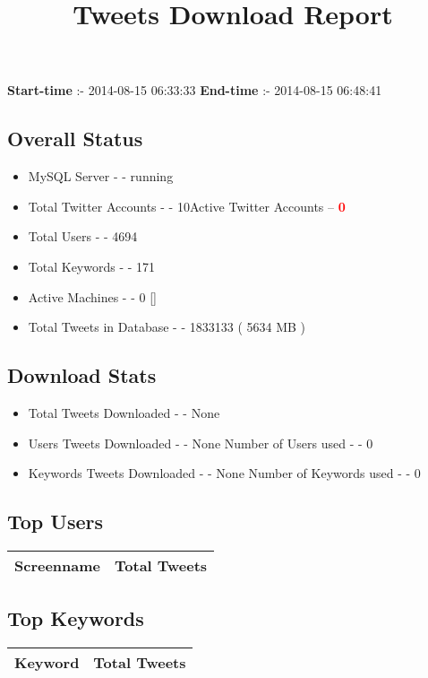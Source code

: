 \documentclass{article}\usepackage[T1]{fontenc}
\begin{document}
\title{\textbf{Tweets Download Report}}
               \date{}
                \maketitle
               \centerline{\textbf{Start-time} :- 2014-08-15 06:33:33 \hspace{40pt} \textbf{End-time} :- 2014-08-15 06:48:41}               \subsection*{Overall Status}                \begin{itemize}                \item MySQL Server - - running               \item Total Twitter Accounts - - 10\newline Active Twitter Accounts -- \textcolor{red}{\textbf{0}}               \item Total Users - - 4694               \item Total Keywords - - 171               \item Active Machines - - 0 []               \item Total Tweets in Database - - 1833133 ( 5634 MB )               \end{itemize}               \subsection*{Download Stats}                \begin{itemize}                \item Total Tweets Downloaded - - None               \item Users Tweets Downloaded - - None \newline Number of Users used - - 0               \item Keywords Tweets Downloaded - - None \newline Number of Keywords used - - 0              \end{itemize}              \subsection*{Top Users}\begin{tabular}{|c|c|}         \hline         Screenname & Total Tweets \\ 
 \hline
\end{tabular}\subsection*{Top Keywords}\begin{tabular}{|c|c|}         \hline         Keyword & Total Tweets \\ 
 \hline
\end{tabular}
\end{document}
